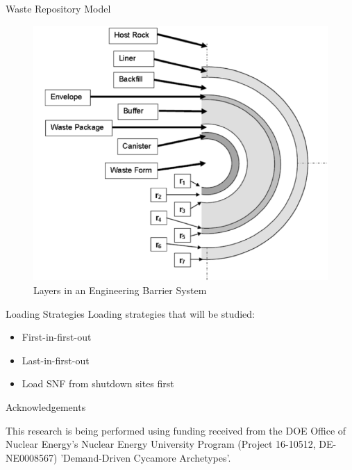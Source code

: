 \documentclass[final]{beamer}
\newlength{\onecolwid}
\newlength{\threecolwid}
\begin{document}
\begin{frame}[t]
\begin{columns}[t,totalwidth=\threecolwid]
\begin{column}{\onecolwid}
\begin{block}{Waste Repository Model}
\begin{figure}
	\label{fig:ebs_layers}
	\includegraphics[width=0.9\linewidth]{ebs_layers}
	\caption{Layers in an Engineering Barrier System \cite{sutton_investigations_2011}}
\end{figure}

\end{block}


\begin{block}{Loading Strategies}
Loading strategies that will be studied: 
\begin{itemize}
	\item First-in-first-out
	\item Last-in-first-out
	\item Load \gls{SNF} from shutdown sites first \cite{petersen_determining_2017}
\end{itemize}
\end{block}




\begin{block}{Acknowledgements}
	
	This research is being performed using funding received from 
	the DOE Office of Nuclear Energy's Nuclear Energy University 
	Program (Project 16-10512, DE-NE0008567) 'Demand-Driven Cycamore 
	Archetypes'.
	

\end{block}
\end{column}
\end{columns}
\end{frame}
\end{document}
